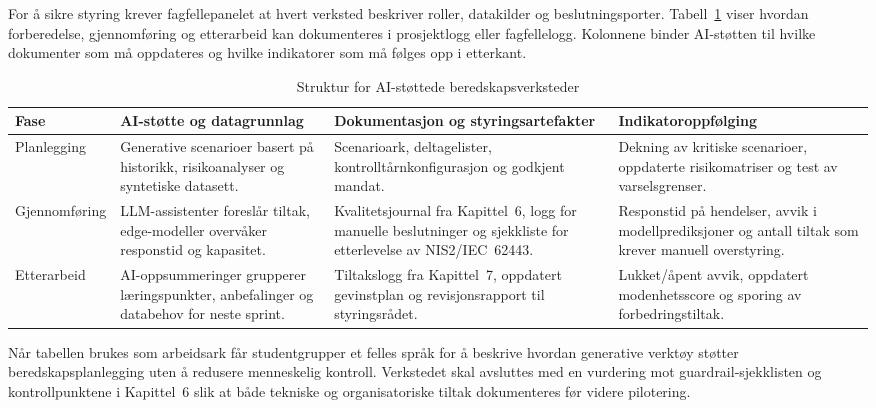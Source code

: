 For å sikre styring krever fagfellepanelet at hvert verksted beskriver roller, datakilder og beslutningsporter. Tabell~\ref{tab:beredskapsverksted-ai} viser hvordan forberedelse, gjennomføring og etterarbeid kan dokumenteres i prosjektlogg eller fagfellelogg. Kolonnene binder AI-støtten til hvilke dokumenter som må oppdateres og hvilke indikatorer som må følges opp i etterkant.

\begin{table}[htbp]
    \centering
    \caption{Struktur for AI-støttede beredskapsverksteder}
    \label{tab:beredskapsverksted-ai}
    \begin{tabular}{p{3.2cm}p{4.2cm}p{4.0cm}p{4.0cm}}
        \toprule
        \textbf{Fase} & \textbf{AI-støtte og datagrunnlag} & \textbf{Dokumentasjon og styringsartefakter} & \textbf{Indikatoroppfølging} \\
        \midrule
        Planlegging & Generative scenarioer basert på historikk, risikoanalyser og syntetiske datasett.\citep{bommasani2021opportunities,nsm2023grunnprinsipper} & Scenarioark, deltagelister, kontrolltårnkonfigurasjon og godkjent mandat. & Dekning av kritiske scenarioer, oppdaterte risikomatriser og test av varselsgrenser. \\
        \addlinespace
        Gjennomføring & LLM-assistenter foreslår tiltak, edge-modeller overvåker responstid og kapasitet.\citep{massterly2023operations,shi2016edge} & Kvalitetsjournal fra Kapittel~6, logg for manuelle beslutninger og sjekkliste for etterlevelse av NIS2/IEC~62443.\citep{eu2022nis2,iec62443-2-1} & Responstid på hendelser, avvik i modellprediksjoner og antall tiltak som krever manuell overstyring. \\
        \addlinespace
        Etterarbeid & AI-oppsummeringer grupperer læringspunkter, anbefalinger og databehov for neste sprint.\citep{digitalnorway2024dataspace} & Tiltakslogg fra Kapittel~7, oppdatert gevinstplan og revisjonsrapport til styringsrådet. & Lukket/åpent avvik, oppdatert modenhetsscore og sporing av forbedringstiltak. \\
        \bottomrule
    \end{tabular}
\end{table}

Når tabellen brukes som arbeidsark får studentgrupper et felles språk for å beskrive hvordan generative verktøy støtter beredskapsplanlegging uten å redusere menneskelig kontroll. Verkstedet skal avsluttes med en vurdering mot guardrail-sjekklisten og kontrollpunktene i Kapittel~6 slik at både tekniske og organisatoriske tiltak dokumenteres før videre pilotering.\citep{eu2024aiact,dfo2024internkontroll}

